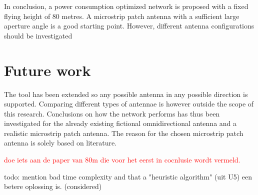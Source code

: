 In conclusion, a power consumption optimized network is proposed with a fixed flying height of 80 metres. A microstrip patch 
antenna with a sufficient large aperture angle is a good starting point. However, different antenna configurations should 
be investigated 

\section{Future work}
The tool has been extended so any possible antenna in any possible direction is supported. Comparing different types 
of antennae is however outside the scope of this research.
Conclusions on how the network performs has thus been investigated for the already existing fictional omnidirectional antenna and a 
realistic microstrip patch antenna. The reason for the chosen microstrip patch antenna is solely based on literature.

\textcolor{red}{doe iets aan de paper van 80m die voor het eerst in cocnlusie wordt vermeld.}

todo: mention bad time complexity and that a "heuristic algorithm" (uit U5) een betere oplossing is. (considered)